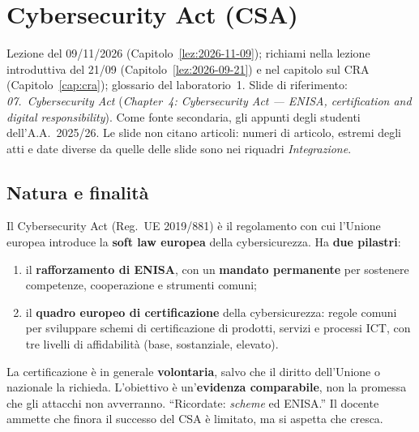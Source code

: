 \chapter{Cybersecurity Act (CSA)}
\label{cap:csa}

\begin{nota}[Fonti]
Lezione del 09/11/2026 (Capitolo~\ref{lez:2026-11-09}); richiami nella lezione introduttiva del 21/09
(Capitolo~\ref{lez:2026-09-21}) e nel capitolo sul CRA (Capitolo~\ref{cap:cra}); glossario del
laboratorio~1. Slide di riferimento: \emph{07.\ Cybersecurity Act} (\emph{Chapter~4: Cybersecurity Act ---
ENISA, certification and digital responsibility}). Come fonte secondaria, gli appunti degli studenti
dell'A.A.~2025/26. Le slide non citano articoli: numeri di articolo, estremi degli atti e date diverse da
quelle delle slide sono nei riquadri \emph{Integrazione}.
\end{nota}

\section{Natura e finalità}
\label{sec:csa-natura}

Il Cybersecurity Act (Reg.~UE 2019/881) è il regolamento con cui l'Unione europea introduce la
\textbf{soft law europea} della cybersicurezza. Ha \textbf{due pilastri}:
\begin{enumerate}
  \item il \textbf{rafforzamento di ENISA}, con un \textbf{mandato permanente} per sostenere competenze,
    cooperazione e strumenti comuni;
  \item il \textbf{quadro europeo di certificazione} della cybersicurezza: regole comuni per sviluppare
    schemi di certificazione di prodotti, servizi e processi ICT, con tre livelli di affidabilità (base,
    sostanziale, elevato).
\end{enumerate}
La certificazione è in generale \textbf{volontaria}, salvo che il diritto dell'Unione o nazionale la
richieda. L'obiettivo è un'\textbf{evidenza comparabile}, non la promessa che gli attacchi non avverranno.
``Ricordate: \emph{scheme} ed ENISA.'' Il docente ammette che finora il successo del CSA è limitato, ma
si aspetta che cresca.

